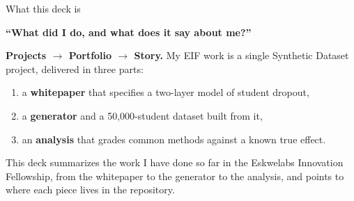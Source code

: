 \documentclass[aspectratio=169,11pt,t]{beamer}
\newcommand{\chiplink}[2]{\hyperlink{#1}{\makebox[2.4cm]{\color{white}\rule[-0.07cm]{0pt}{0.36cm}#2}}}
\begin{document}
\begin{frame}{What this deck is}
  \begin{keybox}
    \centering\sffamily\bfseries\color{eskdeep}
    ``What did I do, and what does it say about me?''
  \end{keybox}
  \smallskip

  \textbf{Projects $\to$ Portfolio $\to$ Story.} My EIF work is a single
  Synthetic Dataset project, delivered in three parts:
  \begin{enumerate}
    \item[\textbf{D1}] a \textbf{whitepaper} that specifies a two-layer model of student dropout,
    \item[\textbf{D2}] a \textbf{generator} and a 50,000-student dataset built from it,
    \item[\textbf{D3}] an \textbf{analysis} that grades common methods against a known true effect.
  \end{enumerate}
  \medskip

  {\small This deck summarizes the work I have done so far in the Eskwelabs Innovation Fellowship, from the whitepaper to the generator to the analysis, and points to where each piece lives in the repository.}
  \medskip

  \begin{center}
  \end{center}
\end{frame}
\end{document}
